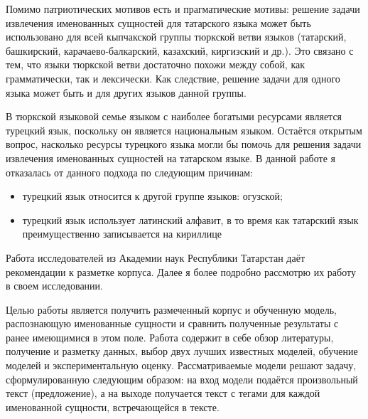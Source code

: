 Помимо патриотических мотивов есть и прагматические мотивы: решение задачи извлечения именованных сущностей для татарского языка может быть использовано для всей кыпчакской группы тюркской ветви языков (татарский, башкирский, карачаево-балкарский, казахский, киргизский и др.). Это связано с тем, что языки тюркской ветви достаточно похожи между собой, как грамматически, так и лексически. Как следствие, решение задачи для одного языка может быть и для других языков данной группы. 

В тюркской языковой семье языком с наиболее богатыми ресурсами является турецкий язык, поскольку он является национальным языком. Остаётся открытым вопрос, насколько ресурсы турецкого языка могли бы помочь для решения задачи извлечения именованных сущностей на татарском языке. В данной работе я отказалась от данного подхода по следующим причинам:
\begin{itemize}
\item турецкий язык относится к другой группе языков: огузской;
\item турецкий язык использует латинский алфавит, в то время как татарский язык преимущественно записывается на кириллице
\end{itemize}

Работа \cite{Nevzorova} исследователей из Академии наук Республики Татарстан даёт рекомендации к разметке корпуса. Далее я более подробно рассмотрю их работу в своем исследовании.

Целью работы является получить размеченный корпус и обученную модель, распознающую именованные сущности и сравнить полученные результаты с ранее имеющимися в этом поле. Работа содержит в себе обзор литературы, получение и разметку данных, выбор двух лучших известных моделей, обучение моделей и экспериментальную оценку. Рассматриваемые модели решают задачу, сформулированную следующим образом: на вход модели подаётся произвольный текст (предложение), а на выходе получается текст с тегами для каждой именованной сущности, встречающейся в тексте.












